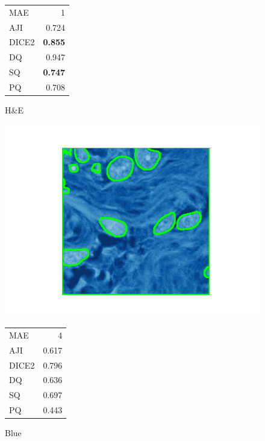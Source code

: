 \documentclass[target=bach,aauheader=,style=]{thud}
\begin{document}
\begin{figure}[ht]
\begin{minipage}{0.48\textwidth}
  \footnotesize
  \begin{tabular}{@{}lr@{}}
   MAE & 1\\ AJI & 0.724\\ DICE2 & \textbf{0.855}\\
   DQ & 0.947\\ SQ & \textbf{0.747}\\ PQ & 0.708
  \end{tabular}
  \caption*{H\&E}
\end{minipage}

\vspace{0.6em}

\begin{minipage}{0.48\textwidth}\centering
  \includegraphics[width=\linewidth]{imgs/qualitative/best/Blu/contour_img.png}\\[-1ex]
  \footnotesize
  \begin{tabular}{@{}lr@{}}
   MAE & 4\\ AJI & 0.617\\ DICE2 & 0.796\\
   DQ & 0.636\\ SQ & 0.697\\ PQ & 0.443
  \end{tabular}
  \caption*{Blue}
\end{minipage}\hfill
\begin{minipage}{0.48\textwidth}\centering

\end{minipage}
\end{figure}
\end{document}
